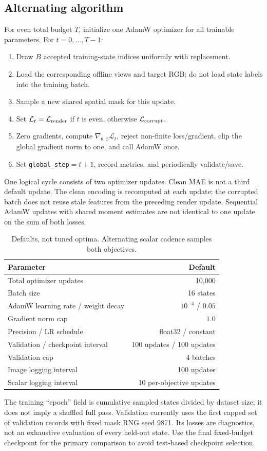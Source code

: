 \documentclass[11pt,a4paper]{article}
\newcommand{\code}[1]{\nolinkurl{#1}}
\newcommand{\Lc}{\mathcal{L}}
\begin{document}
\subsection{Alternating algorithm}
For even total budget $T$, initialize one AdamW optimizer for all trainable parameters.
For $t=0,\ldots,T-1$:
\begin{enumerate}
\item Draw $B$ accepted training-state indices uniformly with replacement.
\item Load the corresponding offline views and target RGB; do not load state labels
into the training batch.
\item Sample a new shared spatial mask for this update.
\item Set $\Lc_t=\Lc_{\rm render}$ if $t$ is even, otherwise $\Lc_{\rm corrupt}$.
\item Zero gradients, compute $\nabla_{\theta,\phi}\Lc_t$, reject non-finite loss/gradient,
clip the global gradient norm to one, and call AdamW once.
\item Set \code{global_step}$=t+1$, record metrics, and periodically validate/save.
\end{enumerate}
One logical cycle consists of two optimizer updates. Clean MAE is not a third default
update. The clean encoding is recomputed at each update; the corrupted batch does
not reuse stale features from the preceding render update. Sequential AdamW updates
with shared moment estimates are not identical to one update on the sum of both losses.

\begin{table}[htbp]\centering\small
\begin{tabular}{lr}
\toprule Parameter & Default \\\midrule
Total optimizer updates & 10,000 \\
Batch size & 16 states \\
AdamW learning rate / weight decay & $10^{-4}$ / $0.05$ \\
Gradient norm cap & $1.0$ \\
Precision / LR schedule & float32 / constant \\
Validation / checkpoint interval & 100 updates / 100 updates \\
Validation cap & 4 batches \\
Image logging interval & 100 updates \\
Scalar logging interval & 10 per-objective updates \\\bottomrule
\end{tabular}
\caption{Defaults, not tuned optima. Alternating scalar cadence samples both objectives.}
\end{table}
The training ``epoch'' field is cumulative sampled states divided by dataset size;
it does not imply a shuffled full pass. Validation currently uses the first capped
set of validation records with fixed mask RNG seed 9871. Its losses are diagnostics,
not an exhaustive evaluation of every held-out state. Use the final fixed-budget
checkpoint for the primary comparison to avoid test-based checkpoint selection.
\end{document}
